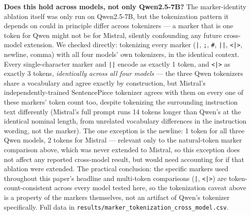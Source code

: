 \documentclass[11pt]{article}
\begin{document}
\textbf{Does this hold across models, not only Qwen2.5-7B?} The marker-identity ablation itself was only run on Qwen2.5-7B, but the tokenization pattern it depends on could in principle differ across tokenizers --- a marker that is one token for Qwen might not be for Mistral, silently confounding any future cross-model extension. We checked directly: tokenizing every marker (\texttt{|}, \texttt{;}, \texttt{\#}, \texttt{||}, \texttt{<|>}, newline, comma) with all four models' own tokenizers, in the identical context. Every single-character marker and \texttt{||} encode as exactly 1 token, and \texttt{<|>} as exactly 3 tokens, \emph{identically across all four models} --- the three Qwen tokenizers share a vocabulary and agree exactly by construction, but Mistral's independently-trained SentencePiece tokenizer agrees with them on every one of these markers' token count too, despite tokenizing the surrounding instruction text differently (Mistral's full prompt runs 14 tokens longer than Qwen's at the identical nominal length, from unrelated vocabulary differences in the instruction wording, not the marker). The one exception is the newline: 1 token for all three Qwen models, 2 tokens for Mistral --- relevant only to the natural-token marker comparison above, which was never extended to Mistral, so this exception does not affect any reported cross-model result, but would need accounting for if that ablation were extended. The practical conclusion: the specific markers used throughout this paper's headline and multi-token comparisons (\texttt{|}, \texttt{<|>}) are token-count-consistent across every model tested here, so the tokenization caveat above is a property of the markers themselves, not an artifact of Qwen's tokenizer specifically. Full data in \texttt{results/marker\_tokenization\_cross\_model.csv}.
\end{document}
